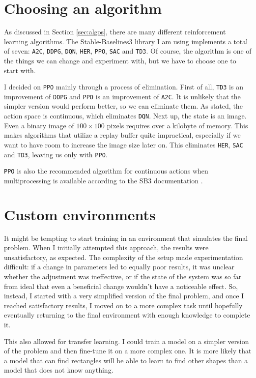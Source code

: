 \documentclass[
  digital,     %
  oneside,     %
  nosansbold,  %
  nocolorbold, %
  lof,         %
  lot,         %
]{fithesis4}
\begin{document}
\section{Choosing an algorithm}
As discussed in Section \ref{sec:algos}, there are many different reinforcement learning algorithms. The Stable-Baselines3 library I am using implements a total of seven: \texttt{A2C}, \texttt{DDPG}, \texttt{DQN}, \texttt{HER}, \texttt{PPO}, \texttt{SAC} and \texttt{TD3}. Of course, the algorithm is one of the things we can change and experiment with, but we have to choose one to start with.

I decided on \texttt{PPO} mainly through a process of elimination. First of all, \texttt{TD3} is an improvement of \texttt{DDPG} and \texttt{PPO} is an improvement of \texttt{A2C}. It is unlikely that the simpler version would perform better, so we can eliminate them. As stated, the action space is continuous, which eliminates \texttt{DQN}. Next up, the state is an image. Even a binary image of $100\times100$ pixels requires over a kilobyte of memory. This makes algorithms that utilize a replay buffer quite impractical, especially if we want to have room to increase the image size later on. This eliminates \texttt{HER}, \texttt{SAC} and \texttt{TD3}, leaving us only with \texttt{PPO}.

\texttt{PPO} is also the recommended algorithm for continuous actions when multiprocessing is available according to the SB3 documentation \cite{SB3-docs}.

\section{Custom environments}
It might be tempting to start training in an environment that simulates the final problem. When I initially attempted this approach, the results were unsatisfactory, as expected. The complexity of the setup made experimentation difficult: if a change in parameters led to equally poor results, it was unclear whether the adjustment was ineffective, or if the state of the system was so far from ideal that even a beneficial change wouldn't have a noticeable effect. So, instead, I started with a very simplified version of the final problem, and once I reached satisfactory results, I moved on to a more complex task until hopefully eventually returning to the final environment with enough knowledge to complete it.

This also allowed for transfer learning. I could train a model on a simpler version of the problem and then fine-tune it on a more complex one. It is more likely that a model that can find rectangles will be able to learn to find other shapes than a model that does not know anything.
\end{document}
